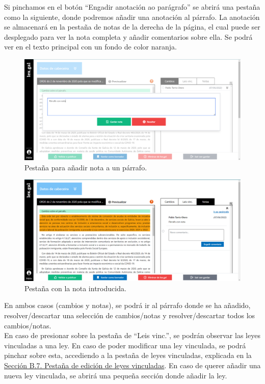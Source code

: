 Si pinchamos en el botón ``Engadir anotación ao parágrafo'' se abrirá una pestaña como la siguiente, donde podremos añadir una anotación al párrafo. La anotación se almacenará en la pestaña de notas de la derecha de la página, el cual puede ser desplegado para ver la nota completa y añadir comentarios sobre ella. Se podrá ver en el texto principal con un fondo de color naranja.

\begin{figure}[H]
\centerline{\includegraphics[width=15cm]{figuras/manualUsuario/Notas.PNG}}
\caption{Pestaña para añadir nota a un párrafo.}
\label{enlaceNotas}
\end{figure}

\begin{figure}[H]
\centerline{\includegraphics[width=15cm]{figuras/manualUsuario/PestanaNotas.PNG}}
\caption{Pestaña con la nota introducida.}
\label{enlacePestanaNotas}
\end{figure}

En ambos casos (cambios y notas), se podrá ir al párrafo donde se ha añadido, resolver/descartar una selección de cambios/notas y resolver/descartar todos los cambios/notas.
\\

En caso de presionar sobre la pestaña de ``Leis vinc.'', se podrán observar las leyes vinculadas a una ley. En caso de poder modificar una ley vinculada, se podrá pinchar sobre esta, accediendo a la pestaña de leyes vinculadas, explicada en la \hyperref[PPrevisualizacionLexGal]{Sección B.7. Pestaña de edición de leyes vinculadas}. En caso de querer añadir una nueva ley vinculada, se abrirá una pequeña sección donde añadir la ley.


